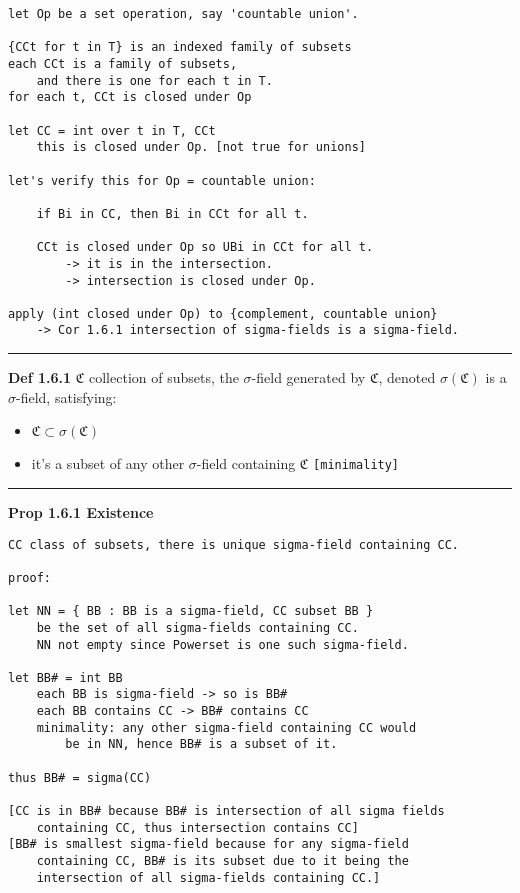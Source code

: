 \documentclass{article}
\begin{document}
\begin{flushleft}
\begin{verbatim}
let Op be a set operation, say 'countable union'. 

{CCt for t in T} is an indexed family of subsets
each CCt is a family of subsets, 
    and there is one for each t in T.
for each t, CCt is closed under Op

let CC = int over t in T, CCt
    this is closed under Op. [not true for unions]

let's verify this for Op = countable union:

    if Bi in CC, then Bi in CCt for all t.

    CCt is closed under Op so UBi in CCt for all t. 
        -> it is in the intersection.
        -> intersection is closed under Op.

apply (int closed under Op) to {complement, countable union}
    -> Cor 1.6.1 intersection of sigma-fields is a sigma-field.
\end{verbatim}

\bigbreak
\hrule
\bigbreak
\textbf{Def 1.6.1} $\mathfrak{C}$ collection of subsets, the $\sigma$-field generated by $\mathfrak{C}$, denoted $\sigma(\mathfrak{C})$ is a $\sigma$-field, satisfying:

\begin{itemize}
    \item $\mathfrak{C} \subset \sigma(\mathfrak{C})$
    \item it's a subset of any other $\sigma$-field containing $\mathfrak{C}$ \hfill \texttt{[minimality]}
\end{itemize}

\bigbreak
\hrule
\bigbreak
\textbf{Prop 1.6.1 Existence}

\begin{verbatim}
CC class of subsets, there is unique sigma-field containing CC.

proof:

let NN = { BB : BB is a sigma-field, CC subset BB }
    be the set of all sigma-fields containing CC. 
    NN not empty since Powerset is one such sigma-field.

let BB# = int BB 
    each BB is sigma-field -> so is BB# 
    each BB contains CC -> BB# contains CC
    minimality: any other sigma-field containing CC would 
        be in NN, hence BB# is a subset of it.
    
thus BB# = sigma(CC)

[CC is in BB# because BB# is intersection of all sigma fields 
    containing CC, thus intersection contains CC]
[BB# is smallest sigma-field because for any sigma-field 
    containing CC, BB# is its subset due to it being the 
    intersection of all sigma-fields containing CC.]


\end{verbatim}
\end{flushleft}
\end{document}
